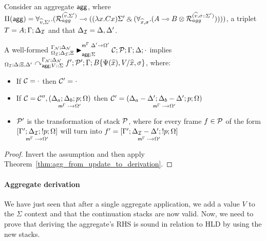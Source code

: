 \begin{corollary}\label{thm:agg_match_to_derivation}
Consider an aggregate $\m{agg}$, where $\Pi(\m{agg}) = \forall_{\widehat{v}, \Sigma'}.
   (\defstwo{agg}{\widehat{v}}{\Sigma'} \lolli ((\lambda x. C x)\Sigma' \with (\forall_{\widehat{x}, \sigma}.
                                                (A \lolli B \otimes
                                                 \defstwo{agg}{\widehat{v}}{\sigma
                                                 ::\Sigma'}))))$,
a triplet $T = A; \Gamma; \deltan$ and that $\deltan = \Delta,
  \Delta'$.

A well-formed $\matstatea{\deltan}{\lstack{C}; \lstack{P}}{\Gamma}{\Delta}{\cdot}{\Delta' \rightarrow \Omega'}{\Sigma}$
implies
$\derstatea{\Delta}{\Xi, \Delta'}{\gammanew}{\deltanew}{V :: \Sigma}{f';
   \lstack{P'}}{B\{\Psi(\widehat{x}), V / \widehat{x}, \sigma\}}$,
where:
   
\begin{itemize}[leftmargin=*]
   \item If $\lstack{C} = \cdot$ then $\lstack{C'} = \cdot$

   \item If $\lstack{C} = \lstack{C''},
   \lframe{\Delta_a}{\Delta_b}{p}{\Omega}{\cdot}{\Omega'}$
   then $\lstack{C'} = \lframe{\Delta_a - \Delta'}{\Delta_b -
      \Delta'}{p}{\Omega}{\cdot}{\Omega'}$

   \item $\lstack{P'}$ is the transformation of stack $\lstack{P}$, where for every frame $f \in
   \lstack{P}$ of the form $\pframe{\Gamma'}{\deltan}{\bang
      p}{\Omega}{\cdot}{\Omega'}$
   will turn into $f' = \pframe{\Gamma'}{\deltan-\Delta'}{\bang
      p}{\Omega}{\cdot}{\Omega'}$

\end{itemize}
\end{corollary}

\begin{proof}
Invert the assumption and then apply Theorem~\ref{thm:agg_from_update_to_derivation}.
\end{proof}


\paragraph{Aggregate derivation}

We have just seen that after a single aggregate application, we add a value $V$
to the $\Sigma$ context and that the continuation stacks are now valid.
Now, we need to prove that deriving the aggregate's RHS
is sound in relation to HLD by using the new stacks.

